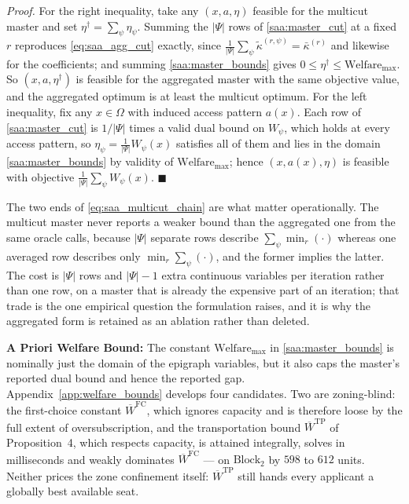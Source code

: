 \documentclass{article}
\begin{document}
\textit{Proof.} For the right inequality, take any $(x, a, \eta)$ feasible for the multicut master and set $\eta^\dagger = \sum_\psi \eta_\psi$. Summing the $|\Psi|$ rows of \eqref{saa:master_cut} at a fixed $r$ reproduces \eqref{eq:saa_agg_cut} exactly, since $\frac{1}{|\Psi|}\sum_\psi \tilde\kappa^{(r,\psi)} = \bar\kappa^{(r)}$ and likewise for the coefficients; and summing \eqref{saa:master_bounds} gives $0 \le \eta^\dagger \le \text{Welfare}_{\max}$. So $(x, a, \eta^\dagger)$ is feasible for the aggregated master with the same objective value, and the aggregated optimum is at least the multicut optimum. For the left inequality, fix any $x \in \Omega$ with induced access pattern $a(x)$. Each row of \eqref{saa:master_cut} is $1/|\Psi|$ times a valid dual bound on $W_\psi$, which holds at every access pattern, so $\eta_\psi = \frac{1}{|\Psi|} W_\psi(x)$ satisfies all of them and lies in the domain \eqref{saa:master_bounds} by validity of $\text{Welfare}_{\max}$; hence $(x, a(x), \eta)$ is feasible with objective $\frac{1}{|\Psi|}\sum_\psi W_\psi(x)$. $\blacksquare$

The two ends of \eqref{eq:saa_multicut_chain} are what matter operationally. The multicut master never reports a weaker bound than the aggregated one from the same oracle calls, because $|\Psi|$ separate rows describe $\sum_\psi \min_r(\cdot)$ whereas one averaged row describes only $\min_r \sum_\psi (\cdot)$, and the former implies the latter. The cost is $|\Psi|$ rows and $|\Psi| - 1$ extra continuous variables per iteration rather than one row, on a master that is already the expensive part of an iteration; that trade is the one empirical question the formulation raises, and it is why the aggregated form is retained as an ablation rather than deleted.

\noindent\textbf{A Priori Welfare Bound:}
The constant $\text{Welfare}_{\max}$ in \eqref{saa:master_bounds} is nominally just the domain of the epigraph variables, but it also caps the master's reported dual bound and hence the reported gap. Appendix~\ref{app:welfare_bounds} develops four candidates. Two are zoning-blind: the first-choice constant $\overline{W}^{\mathrm{FC}}$, which ignores capacity and is therefore loose by the full extent of oversubscription, and the transportation bound $\overline{W}^{\mathrm{TP}}$ of Proposition~4, which respects capacity, is attained integrally, solves in milliseconds and weakly dominates $\overline{W}^{\mathrm{FC}}$ --- on $\text{Block}_2$ by $598$ to $612$ units. Neither prices the zone confinement itself: $\overline{W}^{\mathrm{TP}}$ still hands every applicant a globally best available seat.
\end{document}
